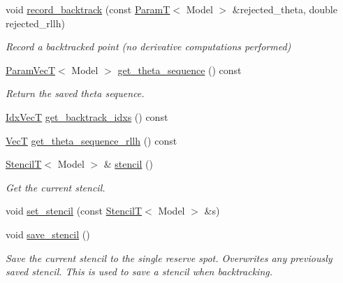 \begin{DoxyCompactItemize}
void \hyperlink{classmappel_1_1IterativeMaximizer_1_1MaximizerData_ae60e71250e72ce3ce5cad912df8f16cf}{record\+\_\+backtrack} (const \hyperlink{namespacemappel_a667925cb0d6c0e49f2f035cc5a9a6857}{ParamT}$<$ Model $>$ \&rejected\+\_\+theta, double rejected\+\_\+rllh)
\begin{DoxyCompactList}\small\item\em Record a backtracked point (no derivative computations performed) \end{DoxyCompactList}\item 
\hyperlink{namespacemappel_a0f86d3153e4e27b095012f140eea58de}{Param\+VecT}$<$ Model $>$ \hyperlink{classmappel_1_1IterativeMaximizer_1_1MaximizerData_aade1d8879a22dff77c2707b379b2203e}{get\+\_\+theta\+\_\+sequence} () const 
\begin{DoxyCompactList}\small\item\em Return the saved theta sequence. \end{DoxyCompactList}\item 
\hyperlink{namespacemappel_ac63743dcd42180127307cd0e4ecdd784}{Idx\+VecT} \hyperlink{classmappel_1_1IterativeMaximizer_1_1MaximizerData_ac9d06c390f911f733c3912dbdcbae954}{get\+\_\+backtrack\+\_\+idxs} () const 
\item 
\hyperlink{namespacemappel_a2225ad69f358daa3f4f99282a35b9a3a}{VecT} \hyperlink{classmappel_1_1IterativeMaximizer_1_1MaximizerData_adda45df3816750fa019f25ff46bf9809}{get\+\_\+theta\+\_\+sequence\+\_\+rllh} () const 
\item 
\hyperlink{namespacemappel_a3a06598240007876f8c4bf834ad86197}{StencilT}$<$ Model $>$ \& \hyperlink{classmappel_1_1IterativeMaximizer_1_1MaximizerData_a29ccc1aa8e5ecf505f4ca76f6b8b214e}{stencil} ()
\begin{DoxyCompactList}\small\item\em Get the current stencil. \end{DoxyCompactList}\item 
void \hyperlink{classmappel_1_1IterativeMaximizer_1_1MaximizerData_a295d06c20f4d620602eece746f4c7d85}{set\+\_\+stencil} (const \hyperlink{namespacemappel_a3a06598240007876f8c4bf834ad86197}{StencilT}$<$ Model $>$ \&s)
\item 
void \hyperlink{classmappel_1_1IterativeMaximizer_1_1MaximizerData_a0349ede0482bdc352643e1eba2ab3f11}{save\+\_\+stencil} ()
\begin{DoxyCompactList}\small\item\em Save the current stencil to the single reserve spot. Overwrites any previously saved stencil. This is used to save a stencil when backtracking. \end{DoxyCompactList}\item 

\end{DoxyCompactItemize}
